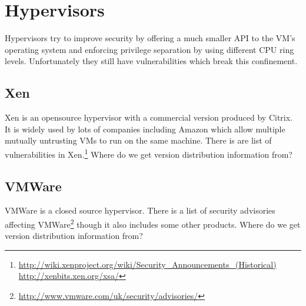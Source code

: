 \documentclass[12pt,a4paper]{article}
\begin{document}
\section{Hypervisors}
Hypervisors try to improve security by offering a much smaller API to the VM's operating system and enforcing privilege separation by using different CPU ring levels.
Unfortunately they still have vulnerabilities which break this confinement.

\subsection{Xen}
Xen is an opensource hypervisor with a commercial version produced by Citrix.
It is widely used by lots of companies including Amazon which allow multiple mutually untrusting VMs to run on the same machine.
There is are list of vulnerabilities in Xen.\footnote{\url{http://wiki.xenproject.org/wiki/Security_Announcements_(Historical)} \url{http://xenbits.xen.org/xsa/}}
Where do we get version distribution information from?

\subsection{VMWare}
VMWare is a closed source hypervisor.
There is a list of security advisories affecting VMWare\footnote{\url{http://www.vmware.com/uk/security/advisories/}} though it also includes some other products.
Where do we get version distribution information from?

\printbibliography
\end{document}
